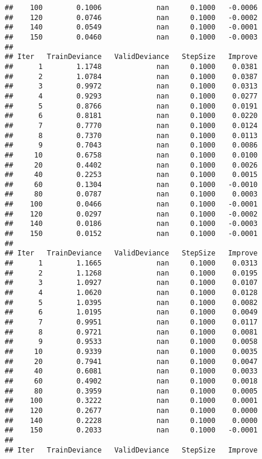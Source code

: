 \documentclass[]{article}
\begin{document}
\begin{verbatim}
##    100        0.1006             nan     0.1000   -0.0006
##    120        0.0746             nan     0.1000   -0.0002
##    140        0.0549             nan     0.1000   -0.0001
##    150        0.0460             nan     0.1000   -0.0003
## 
## Iter   TrainDeviance   ValidDeviance   StepSize   Improve
##      1        1.1748             nan     0.1000    0.0381
##      2        1.0784             nan     0.1000    0.0387
##      3        0.9972             nan     0.1000    0.0313
##      4        0.9293             nan     0.1000    0.0277
##      5        0.8766             nan     0.1000    0.0191
##      6        0.8181             nan     0.1000    0.0220
##      7        0.7770             nan     0.1000    0.0124
##      8        0.7370             nan     0.1000    0.0113
##      9        0.7043             nan     0.1000    0.0086
##     10        0.6758             nan     0.1000    0.0100
##     20        0.4402             nan     0.1000    0.0026
##     40        0.2253             nan     0.1000    0.0015
##     60        0.1304             nan     0.1000   -0.0010
##     80        0.0787             nan     0.1000    0.0003
##    100        0.0466             nan     0.1000   -0.0001
##    120        0.0297             nan     0.1000   -0.0002
##    140        0.0186             nan     0.1000   -0.0003
##    150        0.0152             nan     0.1000   -0.0001
## 
## Iter   TrainDeviance   ValidDeviance   StepSize   Improve
##      1        1.1665             nan     0.1000    0.0313
##      2        1.1268             nan     0.1000    0.0195
##      3        1.0927             nan     0.1000    0.0107
##      4        1.0620             nan     0.1000    0.0128
##      5        1.0395             nan     0.1000    0.0082
##      6        1.0195             nan     0.1000    0.0049
##      7        0.9951             nan     0.1000    0.0117
##      8        0.9721             nan     0.1000    0.0081
##      9        0.9533             nan     0.1000    0.0058
##     10        0.9339             nan     0.1000    0.0035
##     20        0.7941             nan     0.1000    0.0047
##     40        0.6081             nan     0.1000    0.0033
##     60        0.4902             nan     0.1000    0.0018
##     80        0.3959             nan     0.1000    0.0005
##    100        0.3222             nan     0.1000    0.0001
##    120        0.2677             nan     0.1000    0.0000
##    140        0.2228             nan     0.1000    0.0000
##    150        0.2033             nan     0.1000   -0.0001
## 
## Iter   TrainDeviance   ValidDeviance   StepSize   Improve

\end{verbatim}
\end{document}
